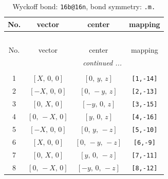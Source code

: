 \documentclass[fleqn,8pt]{jsarticle}
\begin{document}
\begin{longtable}{cccc}
\caption{Wyckoff bond: {\tt 16b@16n}, bond symmetry: {\tt .m.}}
 \\
 \hline \hline
No. & vector & center & mapping \\ \hline \endfirsthead

\multicolumn{3}{l}{\tablename\ \thetable{}} \\
 \hline \hline
No. & vector & center & mapping \\ \hline \endhead

 \hline \hline
\multicolumn{3}{r}{\footnotesize\it continued ...} \\ \endfoot

 \hline \hline
\multicolumn{3}{r}{} \\ \endlastfoot

1 & $\left[ X,\, 0,\, 0 \right]$ & $\left[ 0,\, y,\, z \right]$ & {\tt [1,-14]} \\ \hline
2 & $\left[ - X,\, 0,\, 0 \right]$ & $\left[ 0,\, - y,\, z \right]$ & {\tt [2,-13]} \\ \hline
3 & $\left[ 0,\, X,\, 0 \right]$ & $\left[ - y,\, 0,\, z \right]$ & {\tt [3,-15]} \\ \hline
4 & $\left[ 0,\, - X,\, 0 \right]$ & $\left[ y,\, 0,\, z \right]$ & {\tt [4,-16]} \\ \hline
5 & $\left[ - X,\, 0,\, 0 \right]$ & $\left[ 0,\, y,\, - z \right]$ & {\tt [5,-10]} \\ \hline
6 & $\left[ X,\, 0,\, 0 \right]$ & $\left[ 0,\, - y,\, - z \right]$ & {\tt [6,-9]} \\ \hline
7 & $\left[ 0,\, X,\, 0 \right]$ & $\left[ y,\, 0,\, - z \right]$ & {\tt [7,-11]} \\ \hline
8 & $\left[ 0,\, - X,\, 0 \right]$ & $\left[ - y,\, 0,\, - z \right]$ & {\tt [8,-12]} \\
\end{longtable}
\renewcommand{\arraystretch}{1.2}
\end{document}
